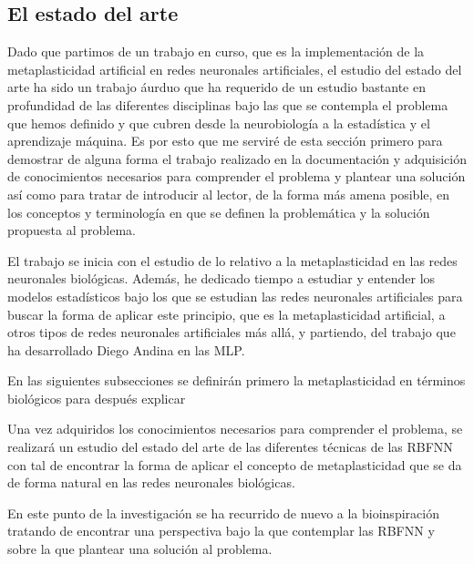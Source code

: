 \documentclass[10pt,a4paper, twocolumn]{report}
\begin{document}
\subsection{El estado del arte}
Dado que partimos de un trabajo en curso, que es la implementación de la metaplasticidad artificial en redes neuronales artificiales, el estudio del estado del arte ha sido un trabajo áurduo que ha requerido de un estudio bastante en profundidad de las diferentes disciplinas bajo las que se contempla el problema que hemos definido y que cubren desde la neurobiología a la estadística y el aprendizaje máquina. Es por esto que me serviré de esta sección primero para demostrar de alguna forma el trabajo realizado en la documentación y adquisición de conocimientos necesarios para comprender el problema y plantear una solución así como para tratar de introducir al lector, de la forma más amena posible, en los conceptos y terminología en que se definen la problemática y la solución propuesta al problema.

El trabajo se inicia con el estudio de lo relativo a la metaplasticidad en las redes neuronales biológicas. Además, he dedicado tiempo a estudiar y entender los modelos estadísticos bajo los que se estudian las redes neuronales artificiales para buscar la forma de aplicar este principio, que es la metaplasticidad artificial, a otros tipos de redes neuronales artificiales más allá, y partiendo, del trabajo que ha desarrollado Diego Andina en las MLP.

En las siguientes subsecciones se definirán primero la metaplasticidad en términos biológicos para después explicar

Una vez adquiridos los conocimientos necesarios para comprender el problema, se realizará un estudio del estado del arte de las diferentes técnicas de las RBFNN con tal de encontrar la forma de aplicar el concepto de metaplasticidad que se da de forma natural en las redes neuronales biológicas.

En este punto de la investigación se ha recurrido de nuevo a la bioinspiración tratando de encontrar una perspectiva bajo la que contemplar las RBFNN y sobre la que plantear una solución al problema. 

\end{document}
